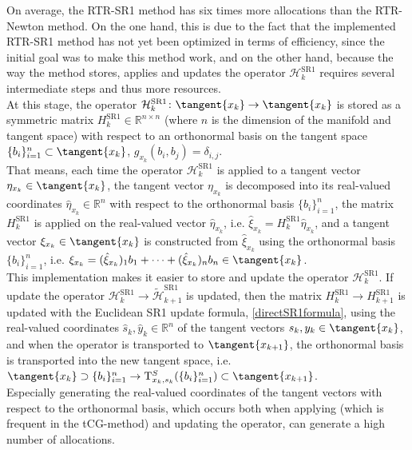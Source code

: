 On average, the RTR-SR1 method has six times more allocations than the RTR-Newton method. On the one hand, this is due to the fact that the implemented RTR-SR1 method has not yet been optimized in terms of efficiency, since the initial goal was to make this method work, and on the other hand, because the way the method stores, applies and updates the operator $\mathcal{H}^{\mathrm{SR1}}_k$ requires several intermediate steps and thus more resources. \\
At this stage, the operator $\mathcal{H}^{\mathrm{SR1}}_k \colon \tangent{x_k} \to \tangent{x_k}$ is stored as a symmetric matrix $H^{\mathrm{SR1}}_k \in \mathbb{R}^{n \times n}$ (where $n$ is the dimension of the manifold and tangent space) with respect to an orthonormal basis on the tangent space $\{ b_i \}^{n}_{i=1} \subset \tangent{x_k}$, $g_{x_k}(b_i, b_j) = \delta_{i,j}$. \\
That means, each time the operator $\mathcal{H}^{\mathrm{SR1}}_k$ is applied to a tangent vector $\eta_{x_k} \in \tangent{x_k}$, the tangent vector $\eta_{x_k}$ is decomposed into its real-valued coordinates $\hat{\eta}_{x_k} \in \mathbb{R}^n$ with respect to the orthonormal basis $\{ b_i \}^{n}_{i=1}$, the matrix $H^{\mathrm{SR1}}_k$ is applied on the real-valued vector $\hat{\eta}_{x_k}$, i.e. $\hat{\xi}_{x_k} = H^{\mathrm{SR1}}_k \hat{\eta}_{x_k}$, and a tangent vector $\xi_{x_k} \in \tangent{x_k}$ is constructed from $\hat{\xi}_{x_k}$ using the orthonormal basis $\{ b_i \}^{n}_{i=1}$, i.e. $\xi_{x_k} = (\hat{\xi}_{x_k})_{1} b_1 + \cdots + (\hat{\xi}_{x_k})_{n} b_n \in \tangent{x_k}$. \\
This implementation makes it easier to store and update the operator $\mathcal{H}^{\mathrm{SR1}}_k$. If update the operator $\mathcal{H}^{\mathrm{SR1}}_k \rightarrow \widetilde{\mathcal{H}}^{\mathrm{SR1}}_{k+1}$ is updated, then the matrix $H^{\mathrm{SR1}}_k \rightarrow H^{\mathrm{SR1}}_{k+1}$ is updated with the Euclidean SR1 update formula, \cref{directSR1formula}, using the real-valued coordinates $\hat{s}_k, \hat{y}_k \in \mathbb{R}^n$ of the tangent vectors $s_k, y_k \in \tangent{x_k}$, and when the operator is transported to $\tangent{x_{k+1}}$, the orthonormal basis is transported into the new tangent space, i.e. $\tangent{x_k} \supset \{ b_i \}^{n}_{i=1} \rightarrow \mathrm{T}^{S}_{x_k, s_k}(\{ b_i \}^{n}_{i=1}) \subset \tangent{x_{k+1}}$. \\ 
Especially generating the real-valued coordinates of the tangent vectors with respect to the orthonormal basis, which occurs both when applying (which is frequent in the tCG-method) and updating the operator, can generate a high number of allocations. \\
